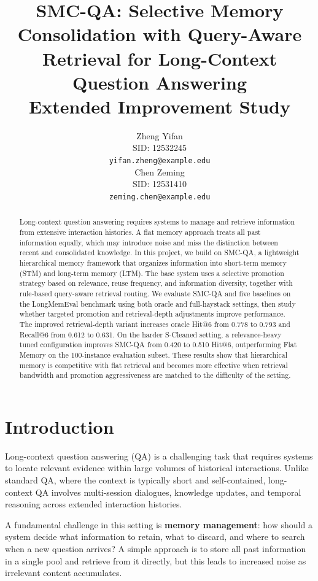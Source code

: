 \documentclass{article}
\title{SMC-QA: Selective Memory Consolidation with Query-Aware Retrieval for Long-Context Question Answering\\
\large Extended Improvement Study}
\author{
  Zheng Yifan \\
  SID: 12532245 \\
  \texttt{yifan.zheng@example.edu} \\
  \And
  Chen Zeming \\
  SID: 12531410 \\
  \texttt{zeming.chen@example.edu} \\
}
\begin{document}
\maketitle

\begin{abstract}
Long-context question answering requires systems to manage and retrieve information from extensive interaction histories. A flat memory approach treats all past information equally, which may introduce noise and miss the distinction between recent and consolidated knowledge. In this project, we build on SMC-QA, a lightweight hierarchical memory framework that organizes information into short-term memory (STM) and long-term memory (LTM). The base system uses a selective promotion strategy based on relevance, reuse frequency, and information diversity, together with rule-based query-aware retrieval routing. We evaluate SMC-QA and five baselines on the LongMemEval benchmark using both oracle and full-haystack settings, then study whether targeted promotion and retrieval-depth adjustments improve performance. The improved retrieval-depth variant increases oracle Hit@6 from 0.778 to 0.793 and Recall@6 from 0.612 to 0.631. On the harder S-Cleaned setting, a relevance-heavy tuned configuration improves SMC-QA from 0.420 to 0.510 Hit@6, outperforming Flat Memory on the 100-instance evaluation subset. These results show that hierarchical memory is competitive with flat retrieval and becomes more effective when retrieval bandwidth and promotion aggressiveness are matched to the difficulty of the setting.
\end{abstract}

\section{Introduction}

Long-context question answering (QA) is a challenging task that requires systems to locate relevant evidence within large volumes of historical interactions. Unlike standard QA, where the context is typically short and self-contained, long-context QA involves multi-session dialogues, knowledge updates, and temporal reasoning across extended interaction histories.

A fundamental challenge in this setting is \textbf{memory management}: how should a system decide what information to retain, what to discard, and where to search when a new question arrives? A simple approach is to store all past information in a single pool and retrieve from it directly, but this leads to increased noise as irrelevant content accumulates.
\end{document}
